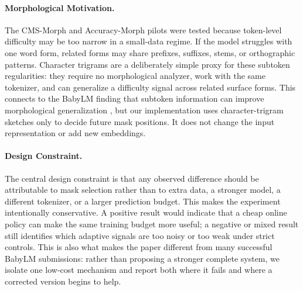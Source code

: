 \paragraph{Morphological Motivation.}
The CMS-Morph and Accuracy-Morph pilots were tested because token-level difficulty may be too narrow in a small-data regime. If the model struggles with one word form, related forms may share prefixes, suffixes, stems, or orthographic patterns. Character trigrams are a deliberately simple proxy for these subtoken regularities: they require no morphological analyzer, work with the same tokenizer, and can generalize a difficulty signal across related surface forms. This connects to the BabyLM finding that subtoken information can improve morphological generalization \citep{edman2025mask}, but our implementation uses character-trigram sketches only to decide future mask positions. It does not change the input representation or add new embeddings.

\paragraph{Design Constraint.}
The central design constraint is that any observed difference should be attributable to mask selection rather than to extra data, a stronger model, a different tokenizer, or a larger prediction budget. This makes the experiment intentionally conservative. A positive result would indicate that a cheap online policy can make the same training budget more useful; a negative or mixed result still identifies which adaptive signals are too noisy or too weak under strict controls. This is also what makes the paper different from many successful BabyLM submissions: rather than proposing a stronger complete system, we isolate one low-cost mechanism and report both where it fails and where a corrected version begins to help.
